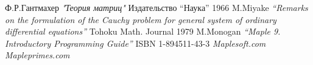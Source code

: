 \documentclass[14pt, a4paper]{extreport}
\begin{document}
\begin{thebibliography}{5}
		Ф.Р.Гантмахер
		\textit{"Теория матриц"}
		Издательство “Наука” 1966
		M.Miyake
		\textit{“Remarks on the formulation of the Cauchy problem
		for general system of ordinary differential equations”}
		Tohoku Math. Journal 1979
		M.Monogan
		\textit{“Maple 9. Introductory Programming Guide”}
		ISBN 1-894511-43-3
		\textit{Maplesoft.com}
		\textit{Mapleprimes.com}
\end{thebibliography}
\end{document}
